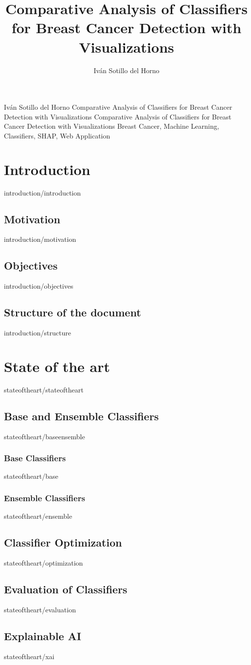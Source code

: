\documentclass[covers, firstnumbered, tfg, epsbased, english]{tfgtfmthesisuam}
\title{Comparative Analysis of Classifiers for Breast Cancer Detection with Visualizations}
\author{Iván Sotillo del Horno}
\begin{document}
\pdfmetavalues
{Iván Sotillo del Horno}
{Comparative Analysis of Classifiers for Breast Cancer Detection with Visualizations}
{Comparative Analysis of Classifiers for Breast Cancer Detection with Visualizations}
{Breast Cancer, Machine Learning, Classifiers, SHAP, Web Application}

\chapter{Introduction}{introduction/introduction}
\section{Motivation}{introduction/motivation}
\section{Objectives}{introduction/objectives}
\section{Structure of the document}{introduction/structure}

\chapter{State of the art}{stateoftheart/stateoftheart}
\section{Base and Ensemble Classifiers}{stateoftheart/baseensemble}
\subsection{Base Classifiers}{stateoftheart/base}
\subsection{Ensemble Classifiers}{stateoftheart/ensemble}
\section{Classifier Optimization}{stateoftheart/optimization}
\section{Evaluation of Classifiers}{stateoftheart/evaluation}

\section{Explainable AI}{stateoftheart/xai}
\end{document}

